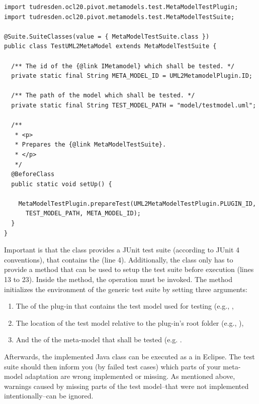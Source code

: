 \lstset{
  language=Java
}
\begin{lstlisting}[caption={An instantiation of the generic meta-model test suite.}, captionpos=b, label=list:metaModelTestSuite:constraints01, float]
import tudresden.ocl20.pivot.metamodels.test.MetaModelTestPlugin;
import tudresden.ocl20.pivot.metamodels.test.MetaModelTestSuite;

@Suite.SuiteClasses(value = { MetaModelTestSuite.class })
public class TestUML2MetaModel extends MetaModelTestSuite {

  /** The id of the {@link IMetamodel} which shall be tested. */
  private static final String META_MODEL_ID = UML2MetamodelPlugin.ID;

  /** The path of the model which shall be tested. */
  private static final String TEST_MODEL_PATH = "model/testmodel.uml";

  /**
   * <p>
   * Prepares the {@link MetaModelTestSuite}.
   * </p>
   */
  @BeforeClass
  public static void setUp() {

    MetaModelTestPlugin.prepareTest(UML2MetaModelTestPlugin.PLUGIN_ID, 
      TEST_MODEL_PATH, META_MODEL_ID);
  }
}
\end{lstlisting}

Important is that the class provides a JUnit test suite (according to JUnit 4 conventions), that contains the  (line 4). Additionally, the class only has to provide a  method that can be used to setup the test suite before execution (lines 13 to 23). Inside the  method, the operation  must be invoked. The method initializes the environment of the generic test suite by setting three arguments:

\begin{enumerate}
	\item The  of the plug-in that contains the test model used for testing (e.g., ,
	\item The location of the test model relative to the plug-in's root folder (e.g., ),
	\item And the  of the meta-model that shall be tested (e.g. .
\end{enumerate}

Afterwards, the implemented Java class can be executed as a  in Eclipse. The test suite should then inform you (by failed test cases) which parts of your meta-model adaptation are wrong implemented or missing. As mentioned above, warnings caused by missing parts of the test model--that were not implemented intentionally--can be ignored.


